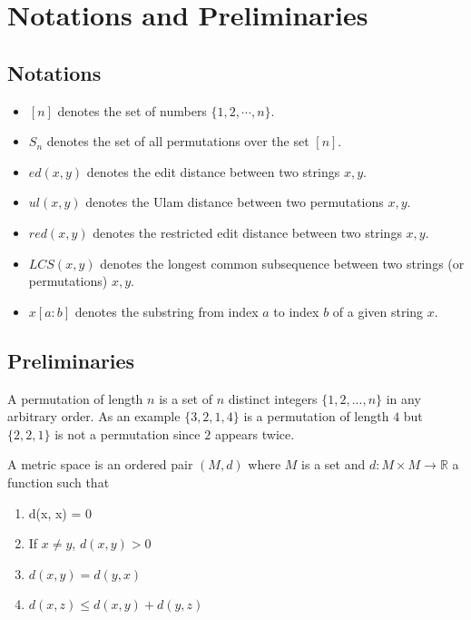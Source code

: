 \chapter{Notations and Preliminaries}

\section{Notations}
\label{notations}

\begin{itemize}
    \item $[n]$ denotes the set of numbers $\{1, 2, \cdots, n\}$.
    \item $S_n$ denotes the set of all permutations over the set $[n]$.
    \item $ed(x, y)$ denotes the edit distance between two strings $x, y$.
    \item $ul(x, y)$ denotes the Ulam distance between two permutations $x, y$.
    \item $red(x, y)$ denotes the restricted edit distance between two strings $x, y$.
    \item $LCS(x, y)$ denotes the longest common subsequence between two strings (or permutations) $x, y$.
    \item $x[a : b]$ denotes the substring from index $a$ to index $b$ of a given string $x$.
\end{itemize}

\section{Preliminaries}
\label{preliminaries}
\begin{definition}[Permutation]
    A permutation of length $n$ is a set of $n$ distinct integers $\{1, 2, ..., n\}$ in any arbitrary order. As an example $\{3, 2, 1, 4\}$ is a permutation of length $4$ but $\{2, 2, 1\}$ is not a permutation since $2$ appears twice.
\end{definition}

\begin{definition}
   A metric space is an ordered pair $(M, d)$ where $M$ is a set and $d: M \times M \rightarrow \mathbb{R}$ a function such that
   \begin{enumerate}
      \item d(x, x) = 0
      \item If $x \neq y$, $d(x, y) > 0$
      \item $d(x, y) = d(y, x)$
      \item $d(x, z) \leq d(x, y) + d(y, z)$
   \end{enumerate}
\end{definition}

